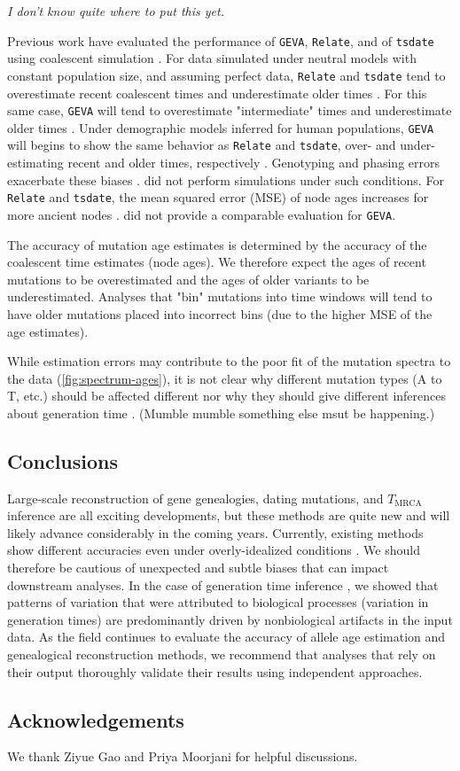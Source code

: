 \documentclass[]{article}
\newcommand{\GEVA}{\texttt{GEVA}\xspace}
\newcommand{\tsdate}{\texttt{tsdate}\xspace}
\newcommand{\relate}{\texttt{Relate}\xspace}
\begin{document}
\textit{I don't know quite where to put this yet.}

Previous work have evaluated the performance of \GEVA, \relate, and of \tsdate using coalescent
simulation \citep{brandt2022evaluation, albers2020dating}.
For data simulated under neutral models with constant population size, and assuming perfect data,
\relate and \tsdate tend to overestimate recent coalescent times and underestimate older times \citep{brandt2022evaluation}.
For this same case, \GEVA will tend to overestimate "intermediate" times and underestimate
older times \cite[see][Fig S1]{albers2020dating}.
Under demographic models inferred for human populations, \GEVA will begins to show the same behavior
as \relate and \tsdate, over- and under- estimating recent and older times,
respectively \cite[][Fig S2]{albers2020dating}.
Genotyping and phasing errors exacerbate these biases \cite[][Figs S3 and S4]{albers2020dating}.
\cite{brandt2022evaluation} did not perform simulations under such conditions.
For \relate and \tsdate, the mean squared error (MSE) of node ages increases for more ancient nodes \cite{brandt2022evaluation}.
\cite{albers2020dating} did not provide a comparable evaluation for \GEVA.

The accuracy of mutation age estimates is determined by the accuracy of the coalescent time estimates (node ages).
We therefore expect the ages of recent mutations to be overestimated and the ages of older variants to be underestimated.
Analyses that "bin" mutations into time windows will tend to have older mutations placed into incorrect bins
(due to the higher MSE of the age estimates).

While estimation errors may contribute to the poor fit of the mutation spectra to the data (\ref{fig:spectrum-ages}),
it is not clear why different mutation types (A to T, etc.) should be affected different nor why
they should give different inferences about generation time \cite[all see][]{gao2023limited}.
(Mumble mumble something else msut be happening.)

\subsection*{Conclusions}

Large-scale reconstruction of gene genealogies, dating mutations, and
$T_\text{MRCA}$ inference are all exciting developments, but these methods are
quite new and will likely advance considerably in the coming years. Currently,
existing methods show different accuracies even under overly-idealized
conditions \citep{brandt2022evaluation}. We should therefore be cautious of
unexpected and subtle biases that can impact downstream analyses. In the case
of generation time inference \citep{wang2023human}, we showed that patterns of
variation that were attributed to biological processes (variation in generation
times) are predominantly driven by nonbiological artifacts in the input data.
As the field continues to evaluate the accuracy of allele age estimation and
genealogical reconstruction methods, we recommend that analyses that rely on
their output thoroughly validate their results using independent approaches.

\subsection*{Acknowledgements}

We thank Ziyue Gao and Priya Moorjani for helpful discussions.



\end{document}
